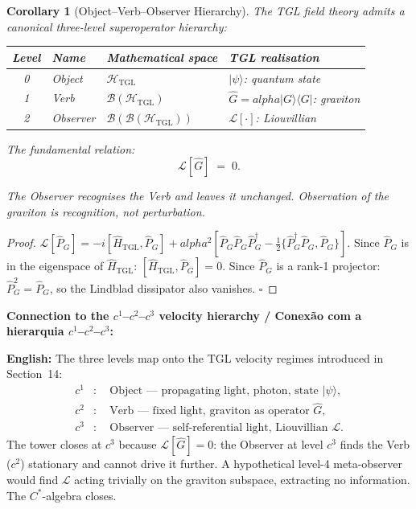 \documentclass[12pt,a4paper]{article}
\newtheorem{corollary}{Corollary}
\def\alpha{alpha}%
\begin{document}
\begin{corollary}[Object--Verb--Observer Hierarchy]
\label{cor:ovo}
The TGL field theory admits a canonical three-level superoperator hierarchy:

\begin{center}
\renewcommand{\arraystretch}{1.3}
\begin{tabular}{clll}
\toprule
Level & Name & Mathematical space & TGL realisation \\
\midrule
0 & Object   & $\mathcal{H}_{\text{TGL}}$                            & $|\psi\rangle$: quantum state \\
1 & Verb     & $\mathcal{B}(\mathcal{H}_{\text{TGL}})$               & $\hat{G} = \alpha|G\rangle\langle G|$: graviton \\
2 & Observer & $\mathcal{B}(\mathcal{B}(\mathcal{H}_{\text{TGL}}))$  & $\mathcal{L}[\cdot]$: Liouvillian \\
\bottomrule
\end{tabular}
\end{center}

The fundamental relation:
\begin{equation}
\boxed{\mathcal{L}[\hat{G}] \;=\; 0.}
\end{equation}

The Observer recognises the Verb and leaves it unchanged. Observation of the graviton is recognition, not perturbation.
\end{corollary}

\begin{proof}
$\mathcal{L}[\hat{P}_G] = -i[\hat{H}_{\text{TGL}},\hat{P}_G] + \alpha^2\!\left[\hat{P}_G\hat{P}_G\hat{P}_G^{\dagger} - \tfrac{1}{2}\{\hat{P}_G^{\dagger}\hat{P}_G,\hat{P}_G\}\right]$.
Since $\hat{P}_G$ is in the eigenspace of $\hat{H}_{\text{TGL}}$: $[\hat{H}_{\text{TGL}},\hat{P}_G] = 0$.
Since $\hat{P}_G$ is a rank-1 projector: $\hat{P}_G^2 = \hat{P}_G$, so the Lindblad dissipator also vanishes. $\square$
\end{proof}

\textbf{Connection to the $c^1$--$c^2$--$c^3$ velocity hierarchy / Conexão com a hierarquia $c^1$--$c^2$--$c^3$:}

\textbf{English:} The three levels map onto the TGL velocity regimes introduced in Section~14:
\begin{align}
c^1 &:\quad \text{Object --- propagating light, photon, state } |\psi\rangle,\\
c^2 &:\quad \text{Verb --- fixed light, graviton as operator } \hat{G},\\
c^3 &:\quad \text{Observer --- self-referential light, Liouvillian } \mathcal{L}.
\end{align}
The tower closes at $c^3$ because $\mathcal{L}[\hat{G}] = 0$: the Observer at level $c^3$ finds the Verb ($c^2$) stationary and cannot drive it further. A hypothetical level-4 meta-observer would find $\mathcal{L}$ acting trivially on the graviton subspace, extracting no information. The $C^*$-algebra closes.
\end{document}

